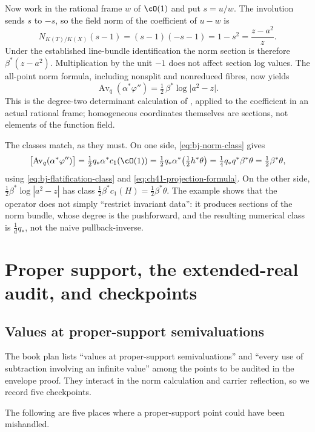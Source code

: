 \begin{example}
Now work in the rational frame $w$ of $\cO(1)$ and put $s=u/w$.
The involution sends $s$ to $-s$, so the field norm of the coefficient
of $u-w$ is
\[
 N_{K(T)/K(X)}(s-1)
 =(s-1)(-s-1)=1-s^2=\frac{z-a^2}{z}.
\]
Under the established line-bundle identification the norm section is
therefore $\beta^*(z-a^2)$.  Multiplication by the unit $-1$
does not affect section log values.  The all-point norm formula,
including nonsplit and nonreduced fibres, now yields
\[
 \operatorname{Av}_q(\alpha^*\varphi'')
 =\tfrac12\,\beta^*\log\bigl|a^2-z\bigr| .
\]
This is the degree-two determinant calculation of
, applied to the coefficient in an actual
rational frame; homogeneous coordinates themselves are sections,
not elements of the function field.

The classes match, as they must.  On one side,
\eqref{eq:bj-norm-class} gives
\[
 \bigl[\operatorname{Av}_q(\alpha^*\varphi'')\bigr]
 =\tfrac12q_*\alpha^*c_1(\cO(1))
 =\tfrac12q_*\alpha^*\bigl(\tfrac12h^*\theta\bigr)
 =\tfrac14q_*q^*\beta^*\theta
 =\tfrac12\beta^*\theta,
\]
using \eqref{eq:bj-flatification-class} and
\eqref{eq:ch41-projection-formula}.  On the other side,
$\tfrac12\beta^*\log|a^2-z|$ has class
$\tfrac12\beta^*c_1(H)=\tfrac12\beta^*\theta$.  The example shows that the
operator does not simply ``restrict invariant data'': it produces sections
of the norm bundle, whose degree is the pushforward, and the resulting
numerical class is $\frac1dq_*$, not the naive pullback-inverse.
\end{example}

\section{Proper support, the extended-real audit, and checkpoints}
\label{sec:ch41-audit}

\subsection{Values at proper-support semivaluations}
\label{sec:ch41-proper-support-audit}

The book plan lists ``values at proper-support semivaluations'' and ``every
use of subtraction involving an infinite value'' among the points to be
audited in the envelope proof.  They interact in the norm calculation and carrier reflection, so
we record five checkpoints.

The following are five places where a proper-support point could have been
mishandled.

